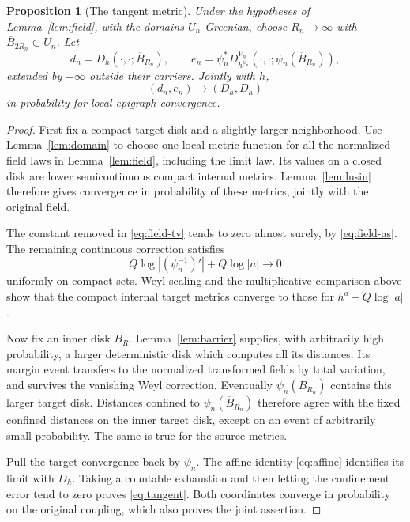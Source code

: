 \documentclass[11pt]{article}
\newtheorem{proposition}[theorem]{Proposition}
\theoremstyle{definition}
\theoremstyle{remark}
\begin{document}
\begin{proposition}[The tangent metric]\label{prop:tangent}
Under the hypotheses of Lemma~\ref{lem:field}, with the domains
$U_n$ Greenian, choose
$R_n\to\infty$ with $\overline B_{2R_n}\subset U_n$. Let
\[
 d_n=D_h(\cdot,\cdot;\overline B_{R_n}),\qquad
 e_n=\psi_n^*D_{h^{\psi_n}}^{V_n}
             (\cdot,\cdot;\psi_n(\overline B_{R_n})),
\]
extended by $+\infty$ outside their carriers. Jointly with $h$,
\begin{equation}\label{eq:tangent}
                     (d_n,e_n)\longrightarrow(D_h,D_h)
\end{equation}
in probability for local epigraph convergence.
\end{proposition}
\begin{proof}
First fix a compact target disk and a slightly larger neighborhood.
Use Lemma~\ref{lem:domain} to choose one local metric function for
all the normalized field laws in Lemma~\ref{lem:field}, including
the limit law. Its values on a closed disk are lower
semicontinuous compact internal metrics. Lemma~\ref{lem:lusin}
therefore gives convergence in probability of these metrics,
jointly with the original field.

The constant removed in \eqref{eq:field-tv} tends to zero almost
surely, by \eqref{eq:field-as}. The remaining continuous
correction satisfies
\[
 Q\log|(\psi_n^{-1})'|+Q\log|a|\longrightarrow0
\]
uniformly on compact sets. Weyl scaling and the multiplicative
comparison above show that the compact internal target metrics
converge to those for $h^a-Q\log|a|$.

Now fix an inner disk $B_R$. Lemma~\ref{lem:barrier} supplies,
with arbitrarily high probability, a larger deterministic disk
which computes all its distances. Its margin event transfers
to the normalized transformed fields by total variation, and
survives the vanishing Weyl correction. Eventually
$\psi_n(B_{R_n})$ contains this larger target disk. Distances
confined to $\psi_n(\overline B_{R_n})$ therefore agree with the
fixed confined distances on the inner target disk, except on
an event of arbitrarily small probability. The same is true
for the source metrics.

Pull the target convergence back by $\psi_n$. The affine identity
\eqref{eq:affine} identifies its limit with $D_h$. Taking a
countable exhaustion and then letting the confinement error tend
to zero proves \eqref{eq:tangent}. Both coordinates converge in
probability on the original coupling, which also proves the
joint assertion.
\end{proof}
\end{document}
